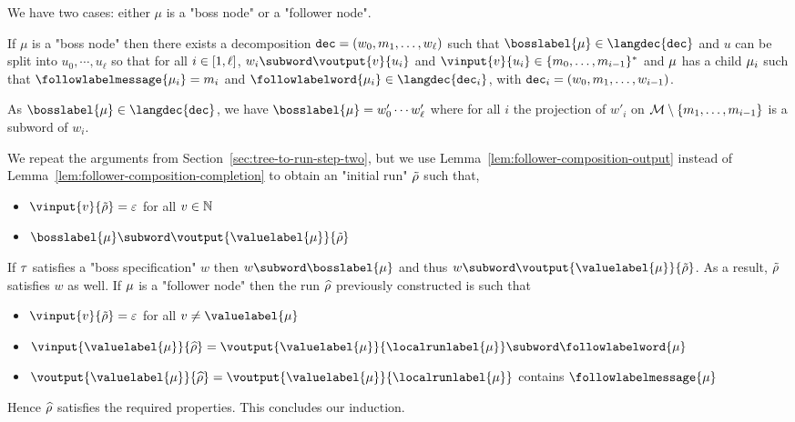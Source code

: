 We have two cases: either $\mu$ is a "boss node" or a "follower node".

If $\mu$ is a "boss node" then there exists a decomposition $\mathtt{dec}=(w_0, m_1, \ldots, w_\ell)$ such that $\bosslabel{\node} \in \langdec{\decsymb}$ and $u$ can be split into $u_0, \cdots, u_\ell$ so that for all $i \in [1,\ell]$, $w_i \subword \voutput{v}{u_i}$ and $\vinput{v}{u_i} \in \set{m_0, \ldots, m_{i-1}}^*$ and $\mu$ has a child $\mu_i$ such that $\followlabelmessage{\mu_i} = m_i$ and $\followlabelword{\node_i} \in \langdec{\decsymb_i}$, with $\mathtt{dec}_i = (w_0, m_1, \ldots, w_{i-1})$.

As $\bosslabel{\node} \in \langdec{\decsymb}$, we have $\bosslabel{\node} = w'_0 \cdots w'_\ell$ where for all $i$ the projection of $w'_i$ on $\mathcal{M}\setminus\{m_1, \ldots, m_{i-1}\}$ is a subword of $w_i$. 

We repeat the arguments from Section~\ref{sec:tree-to-run-step-two}, but we use Lemma~\ref{lem:follower-composition-output} instead of Lemma~\ref{lem:follower-composition-completion} to obtain an "initial run" $\Tilde{\rho}$ such that,
\begin{itemize}	
	\item $\vinput{v}{\Tilde{\run}} = \epsilon$ for all $v \in \mathbb{N}$
	
	\item $\bosslabel{\node} \subword \voutput{\valuelabel{\node}}{\Tilde{\run}}$
\end{itemize}

If $\tau$ satisfies a "boss specification" $w$  then $w \subword \bosslabel{\node} $ and thus $w \subword \voutput{\valuelabel{\node}}{\Tilde{\run}}$.
As a result, $\Tilde{\rho}$ satisfies $w$ as well.
If $\mu$ is a "follower node" then the run $\widehat{\rho}$ previously constructed is such that  

\begin{itemize}	
	\item $\vinput{v}{\Tilde{\run}} = \epsilon$ for all $v \neq \valuelabel{\node}$
	
	\item $\vinput{\valuelabel{\node}}{\widehat{\run}} = \voutput{\valuelabel{\node}}{\localrunlabel{\node}} \subword \followlabelword{\node}$
	
	\item $\voutput{\valuelabel{\node}}{\widehat{\run}} = \voutput{\valuelabel{\node}}{\localrunlabel{\node}}$ contains $\followlabelmessage{\node}$
\end{itemize}

Hence $\widehat{\rho}$ satisfies the required properties.
This concludes our induction.
